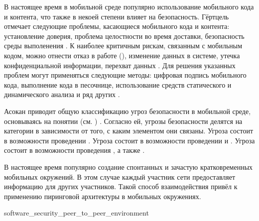 \Sentence
В настоящее время в мобильной среде популярно использование мобильного кода и контента, что также 
в некоей степени влияет на безопасность. 
\Sentence
Гёртцель отмечает следующие проблемы, касающиеся мобильного кода и контента: установление доверия, 
проблема целостности во время доставки, безопасность среды выполенения .
\Sentence
К наиболее критичным рискам, связанным с мобильным кодом, можно отнести отказ в работе (\DoS), 
изменение данных в системе, утечка конфиденциальной информации, перехват данных 
.
\Sentence
Для решения указанных проблем могут применяться следующие методы: цифровая подпись мобильного кода, 
выполнение кода в песочнице, использование средств статического и динамического анализа и ряд 
других    
. 

\Sentence
Асокан приводит общую классификацию угроз безопасности в мобильной среде, основываясь на понятии 
\CIATriad (см. ) .
\Sentence
Согласно ей, угрозы безопасности делятся на категории в зависимости от того, с каким элементом 
\CIATriad они связаны. 
\Sentence
Угроза  состоит в возможности проведении .
\Sentence
Угроза  состоит в возможности проведении  и  
.
\Sentence
Угроза  состоит в возможности проведения , а 
также .

\Sentence
В настоящее время популярно создание спонтанных и зачастую кратковременных мобильных окружений. 
\Sentence
В этом случае каждый участник сети предоставляет информацию для других участников. 
\Sentence
Такой способ взаимодействия привёл к применению пиринговой архитектуры в мобильных окружениях. 


	{software_security_peer_to_peer_environment}
